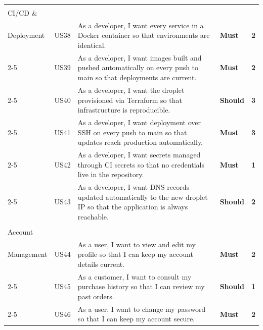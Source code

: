 \begin{longtable}{|>{\centering\arraybackslash\small}p{2.2cm}|>{\centering\arraybackslash\small}p{0.9cm}|>{\small}p{7.4cm}|>{\centering\arraybackslash\small}p{1.3cm}|>{\centering\arraybackslash\small}p{0.6cm}|}
  \cellcolor{featCICD}\makecell[c]{\textbf{F8}\\\small CI/CD \&\\Deployment}
  & US38 & As a developer, I want every service in a Docker container so that environments are identical. & \cellcolor{moscowMust}\textbf{Must} & \cellcolor{complexMed}\textbf{2} \\\cline{2-5}
  \cellcolor{featCICD} & US39 & As a developer, I want images built and pushed automatically on every push to main so that deployments are current. & \cellcolor{moscowMust}\textbf{Must} & \cellcolor{complexMed}\textbf{2} \\\cline{2-5}
  \cellcolor{featCICD} & US40 & As a developer, I want the droplet provisioned via Terraform so that infrastructure is reproducible. & \cellcolor{moscowShould}\textbf{Should} & \cellcolor{complexHigh}\textbf{3} \\\cline{2-5}
  \cellcolor{featCICD} & US41 & As a developer, I want deployment over SSH on every push to main so that updates reach production automatically. & \cellcolor{moscowMust}\textbf{Must} & \cellcolor{complexHigh}\textbf{3} \\\cline{2-5}
  \cellcolor{featCICD} & US42 & As a developer, I want secrets managed through CI secrets so that no credentials live in the repository. & \cellcolor{moscowMust}\textbf{Must} & \cellcolor{complexLow}\textbf{1} \\\cline{2-5}
  \cellcolor{featCICD} & US43 & As a developer, I want DNS records updated automatically to the new droplet IP so that the application is always reachable. & \cellcolor{moscowShould}\textbf{Should} & \cellcolor{complexMed}\textbf{2} \\\hline

  \cellcolor{featAccount}\makecell[c]{\textbf{F9}\\\small Account\\Management}
  & US44 & As a user, I want to view and edit my profile so that I can keep my account details current. & \cellcolor{moscowMust}\textbf{Must} & \cellcolor{complexMed}\textbf{2} \\\cline{2-5}
  \cellcolor{featAccount} & US45 & As a customer, I want to consult my purchase history so that I can review my past orders. & \cellcolor{moscowShould}\textbf{Should} & \cellcolor{complexLow}\textbf{1} \\\cline{2-5}
  \cellcolor{featAccount} & US46 & As a user, I want to change my password so that I can keep my account secure. & \cellcolor{moscowMust}\textbf{Must} & \cellcolor{complexMed}\textbf{2} \\\hline


\end{longtable}
